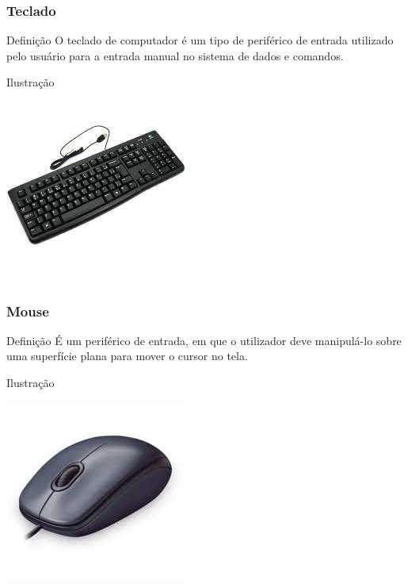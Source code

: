 \documentclass[aspectratio=169]{beamer} %
\begin{document}
\begin{frame}
	\frametitle{Teclado}
	
	\begin{block}{Defini\c cão}
		O teclado de computador é um tipo de periférico de entrada utilizado pelo usuário para a entrada manual no sistema de dados e comandos.
	\end{block}\vfill
	
	\begin{exampleblock}{Ilustra\c cão}
		\begin{center}
			\includegraphics[scale=0.4]{img/teclado}
		\end{center}
	\end{exampleblock}
\end{frame}

\begin{frame}
	\frametitle{Mouse}
	
	\begin{block}{Defini\c cão}
		É um periférico de entrada, em que o utilizador deve manipulá-lo sobre uma superfície plana para mover o cursor no tela.
	\end{block}\vfill
	
	\begin{exampleblock}{Ilustra\c cão}
		\begin{center}
			\includegraphics[scale=0.4]{img/mouse}
		\end{center}		
	\end{exampleblock}
\end{frame}
\end{document}
